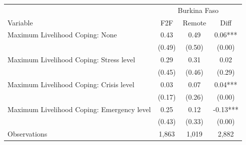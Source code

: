 \begin{tabular}{l*{3}c}
\hline\hline
 & \multicolumn{3}{c}{Burkina Faso}\\ 
Variable & F2F & Remote & Diff \\
\hline
Maximum Livelihood Coping: None&0.43&0.49&0.06***\\
&(0.49)&(0.50)&(0.00)\\
Maximum Livelihood Coping: Stress level&0.29&0.31&0.02\\
&(0.45)&(0.46)&(0.29)\\
Maximum Livelihood Coping: Crisis level&0.03&0.07&0.04***\\
&(0.17)&(0.26)&(0.00)\\
Maximum Livelihood Coping: Emergency level&0.25&0.12&-0.13***\\
&(0.43)&(0.33)&(0.00)\\
\hline
Observations & 1,863 & 1,019 & 2,882 \\
\hline\hline
\end{tabular}
